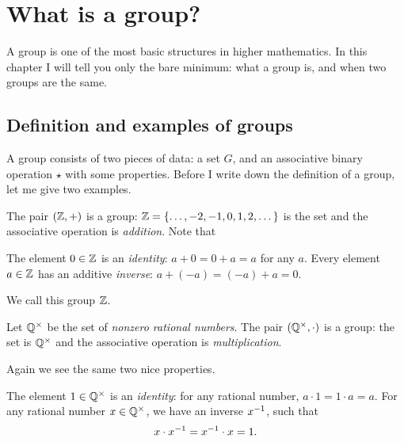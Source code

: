 \chapter{What is a group?}
A group is one of the most basic structures in higher mathematics.
In this chapter I will tell you only the bare minimum:
what a group is, and when two groups are the same.

\section{Definition and examples of groups}

A group consists of two pieces of data: a set $G$, and an associative binary operation $\star$ with some properties.
Before I write down the definition of a group, let me give two examples.

\begin{example}
	The pair $(\mathbb Z, +)$ is a group:
	$\mathbb Z = \left\{ \dots,-2,-1,0,1,2,\dots \right\}$ is the set
	and the associative operation is \emph{addition}.
	Note that
	\begin{itemize}
		\ii The element $0 \in \mathbb Z$ is an \emph{identity}:
		$a+0=0+a = a$ for any $a$.
		\ii Every element $a \in \mathbb Z$ has an additive \emph{inverse}: $a + (-a) = (-a) + a = 0$.
	\end{itemize}
	We call this group $\mathbb Z$.
\end{example}
\begin{example}
	Let $\mathbb Q^\times$ be the set of \emph{nonzero rational numbers}.
	The pair $(\mathbb Q^\times, \cdot)$ is a group:
	the set is $\mathbb Q^\times$
	and the associative operation is \emph{multiplication}.

	Again we see the same two nice properties.
	\begin{itemize}
		\ii The element $1 \in \mathbb Q^\times$ is an \emph{identity}:
		for any rational number, $a \cdot 1 = 1 \cdot a = a$.
		\ii For any rational number $x \in \mathbb Q^\times$,
		we have an inverse $x^{-1}$, such that
		\[ x \cdot x^{-1} = x^{-1} \cdot x = 1. \]
	\end{itemize}
\end{example}

